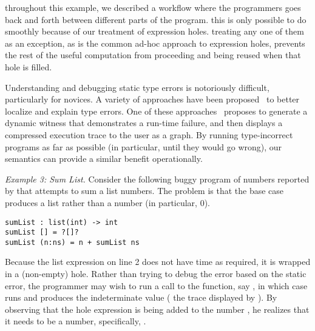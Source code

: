 throughout this example, we described a workflow where the programmers goes back
and forth between different parts of the program.
%
this is only possible to do smoothly because of our treatment of expression
holes.
%
treating any one of them as an exception, as is the common ad-hoc approach to
expression holes, prevents the rest of the useful computation from proceeding
and being reused when that hole is filled.



Understanding and debugging static type errors is notoriously difficult,
particularly for novices.
%
A variety of approaches have been
proposed~\cite{Seminal,ChenErwig2014,Pavlinovic2015,sherrloc} to better localize
and explain type errors.
%
One of these approaches~\cite{Seidel2016} proposes to generate a dynamic witness
that demonstrates a run-time failure, and then displays a compressed execution
trace to the user as a graph.
%
By running type-incorrect programs as far as possible (in particular, until they
would go wrong), our semantics can provide a similar benefit operationally.
%

\emph{Example 3: Sum List.}
%
Consider the following buggy program of numbers reported by \citet{XXX} that
attempts to sum a list numbers.
%
The problem is that the base case produces a list rather than a number (in
particular, 0).

\begin{lstlisting}
sumList : list(int) -> int
sumList [] = ?[]?
sumList (n:ns) = n + sumList ns
\end{lstlisting}

\noindent
%
Because the list expression on line 2 does not have time  as required,
it is wrapped in a (non-empty) hole.
%
Rather than trying to debug the error based on the static error, the programmer
may wish to run a call to the function, say , in which case
\HazelnutLive{} runs and produces the indeterminate value 
(\cf{} the trace displayed by \citet{Seidel2016}).
%
By observing that the hole expression is being added to the number , he
realizes that it needs to be a number, specifically, .



